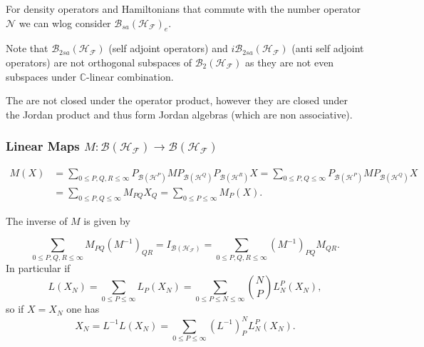\documentclass[aps,preprint]{revtex4}%
\begin{document}
For density operators and Hamiltonians that commute with the number operator
$\mathcal{N}$ we can wlog consider $\mathcal{B}_{sa}\left(  \mathcal{H}%
_{\mathcal{F}}\right)  _{e}.$

Note that $\mathcal{B}_{2sa}\left(  \mathcal{H}_{\mathcal{F}}\right)  $ (self
adjoint operators) and $i\mathcal{B}_{2sa}\left(  \mathcal{H}_{\mathcal{F}%
}\right)  $ (anti self adjoint operators) are not orthogonal subspaces of
$\mathcal{B}_{2}\left(  \mathcal{H}_{\mathcal{F}}\right)  $ as they are not
even subspaces under $\mathbb{C}$-linear combination.

The are not closed under the operator product, however they are closed under
the Jordan product and thus form Jordan algebras (which are non associative).

\subsubsection{Linear Maps $M:\mathcal{B}\left(  \mathcal{H}_{\mathcal{F}%
}\right)  \rightarrow\mathcal{B}\left(  \mathcal{H}_{\mathcal{F}}\right)  $}%

\begin{align}
M\left(  X\right)   &  =\sum_{0\leq P,Q,R\leq\infty}P_{\mathcal{B}\left(
\mathcal{H}^{P}\right)  }MP_{\mathcal{B}\left(  \mathcal{H}^{Q}\right)
}P_{\mathcal{B}\left(  \mathcal{H}^{R}\right)  }X=\sum_{0\leq P,Q\leq\infty
}P_{\mathcal{B}\left(  \mathcal{H}^{P}\right)  }MP_{\mathcal{B}\left(
\mathcal{H}^{Q}\right)  }X\nonumber\\
&  =\sum_{0\leq P,Q\leq\infty}M_{PQ}X_{Q}=\sum_{0\leq P\leq\infty}M_{P}\left(
X\right)  .
\end{align}


The inverse of $M$ is given by%

\begin{equation}
\sum_{0\leq P,Q,R\leq\infty}M_{PQ}\left(  M^{-1}\right)  _{QR}=I_{\mathcal{B}%
\left(  \mathcal{H}_{\mathcal{F}}\right)  }=\sum_{0\leq P,Q,R\leq\infty
}\left(  M^{-1}\right)  _{PQ}M_{QR}.
\end{equation}
In particular if
\begin{equation}
L\left(  X_{N}\right)  =\sum_{0\leq P\leq\infty}L_{P}\left(  X_{N}\right)
=\sum_{0\leq P\leq N\leq\infty}\binom{N}{P}L_{N}^{P}\left(  X_{N}\right)
,\nonumber
\end{equation}
so if $X=X_{N}$ one has
\begin{equation}
X_{N}=L^{-1}L\left(  X_{N}\right)  =\sum_{0\leq P\leq\infty}\left(
L^{-1}\right)  _{P}^{N}L_{N}^{P}\left(  X_{N}\right)  .
\end{equation}
\end{document}
